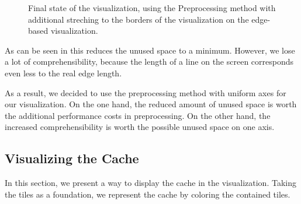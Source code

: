 \documentclass
[
    paper = a4,
    pagesize,
    12 pt,
    twoside,                       %
    open = right,
    DIV = calc,
    BCOR = 0 mm,                   %
    bibtotoc
]
{scrbook}
\begin{document}
\begin{figure}
\caption[]{Final state of the visualization, using the Preprocessing method with additional streching to the borders of the visualization on the edge-based visualization.}
\label{fig:spreaded_axis}
\end{figure}

As can be seen in  this reduces the unused space to a minimum.
However, we lose a lot of comprehensibility, because the length of a line on the screen corresponds even less to the real edge length.

As a result, we decided to use the preprocessing method with uniform axes for our visualization.
On the one hand, the reduced amount of unused space is worth the additional performance costs in preprocessing.
On the other hand, the increased comprehensibility is worth the possible unused space on one axis.


\subsection{Visualizing the Cache} \label{cache}

In this section, we present a way to display the cache in the visualization.
Taking the tiles as a foundation, we represent the cache by coloring the contained tiles.
\end{document}
